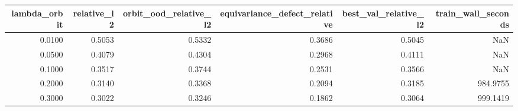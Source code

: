 \begin{tabular}{rrrrrr}
\toprule
lambda_orbit & relative_l2 & orbit_ood_relative_l2 & equivariance_defect_relative & best_val_relative_l2 & train_wall_seconds \\
\midrule
0.0100 & 0.5053 & 0.5332 & 0.3686 & 0.5045 & NaN \\
0.0500 & 0.4079 & 0.4304 & 0.2968 & 0.4111 & NaN \\
0.1000 & 0.3517 & 0.3744 & 0.2531 & 0.3566 & NaN \\
0.2000 & 0.3140 & 0.3368 & 0.2094 & 0.3185 & 984.9755 \\
0.3000 & 0.3022 & 0.3246 & 0.1862 & 0.3064 & 999.1419 \\
\bottomrule
\end{tabular}
